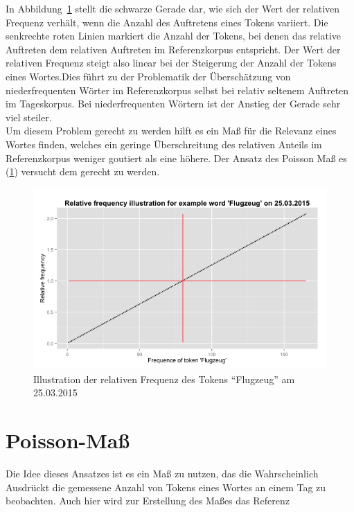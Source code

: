In Abbildung~\ref{pic.rel_freq} stellt die schwarze Gerade dar, wie sich der Wert der relativen Frequenz verhält, wenn die Anzahl des Auftretens eines Tokens variiert. Die senkrechte roten Linien markiert die Anzahl der Tokens, bei denen das relative Auftreten dem relativen Auftreten im Referenzkorpus entspricht. Der Wert der relativen Frequenz steigt also linear bei der Steigerung der Anzahl der Tokens eines Wortes.Dies führt zu der Problematik der Überschätzung von niederfrequenten Wörter im Referenzkorpus selbst bei relativ seltenem Auftreten im Tageskorpus. Bei niederfrequenten Wörtern ist der Anstieg der Gerade sehr viel steiler.\\
Um diesem Problem gerecht zu werden hilft es ein Maß für die Relevanz eines Wortes finden, welches ein geringe Überschreitung des relativen Anteils im Referenzkorpus weniger goutiert als eine höhere. Der Ansatz des Poisson Maß es (\ref{subsec.poisson}) versucht dem gerecht zu werden.\\
\begin{figure}[h!]
    \centering
    \includegraphics[width=1\textwidth]{pictures/relfreqFlugzeug.png}
    \caption{Illustration der relativen Frequenz des Tokens \enquote{Flugzeug} am 25.03.2015}\label{pic.rel_freq}
\end{figure}



\section{Poisson-Maß}\label{subsec.poisson}
Die Idee dieses Ansatzes ist es ein Maß zu nutzen, das die Wahrscheinlich Ausdrückt die gemessene Anzahl von Tokens eines Wortes an einem Tag zu beobachten. Auch hier wird zur Erstellung des Maßes  das Referenz

